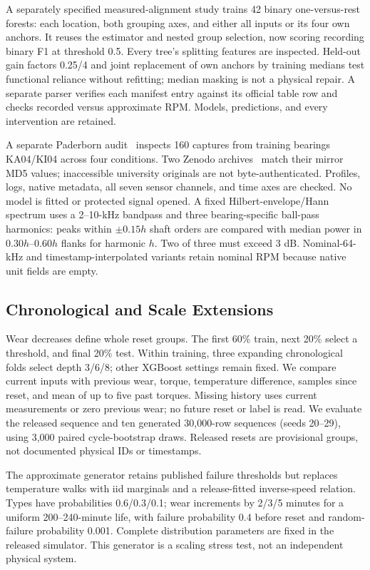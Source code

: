 \documentclass[conference]{IEEEtran}
\begin{document}
A separately specified measured-alignment study trains 42 binary one-versus-rest forests: each location, both grouping axes, and either all inputs or its four own anchors. It reuses the estimator and nested group selection, now scoring recording binary F1 at threshold 0.5. Every tree's splitting features are inspected. Held-out gain factors 0.25/4 and joint replacement of own anchors by training medians test functional reliance without refitting; median masking is not a physical repair. A separate parser verifies each manifest entry against its official table row and checks recorded versus approximate RPM. Models, predictions, and every intervention are retained.

A separate Paderborn audit~\cite{lessmeier2016benchmark} inspects 160 captures from training bearings KA04/KI04 across four conditions. Two Zenodo archives~\cite{vandenhoogen2025paderborn} match their mirror MD5 values; inaccessible university originals are not byte-authenticated. Profiles, logs, native metadata, all seven sensor channels, and time axes are checked. No model is fitted or protected signal opened. A fixed Hilbert-envelope/Hann spectrum uses a 2--10-kHz bandpass and three bearing-specific ball-pass harmonics: peaks within $\pm0.15h$ shaft orders are compared with median power in $0.30h$--$0.60h$ flanks for harmonic $h$. Two of three must exceed 3 dB. Nominal-64-kHz and timestamp-interpolated variants retain nominal RPM because native unit fields are empty.

\subsection{Chronological and Scale Extensions}
Wear decreases define whole reset groups. The first 60\% train, next 20\% select a threshold, and final 20\% test. Within training, three expanding chronological folds select depth 3/6/8; other XGBoost settings remain fixed. We compare current inputs with previous wear, torque, temperature difference, samples since reset, and mean of up to five past torques. Missing history uses current measurements or zero previous wear; no future reset or label is read. We evaluate the released sequence and ten generated 30{,}000-row sequences (seeds 20--29), using 3{,}000 paired cycle-bootstrap draws. Released resets are provisional groups, not documented physical IDs or timestamps.

The approximate generator retains published failure thresholds but replaces temperature walks with iid marginals and a release-fitted inverse-speed relation. Types have probabilities 0.6/0.3/0.1; wear increments by 2/3/5 minutes for a uniform 200--240-minute life, with failure probability 0.4 before reset and random-failure probability 0.001. Complete distribution parameters are fixed in the released simulator. This generator is a scaling stress test, not an independent physical system.
\end{document}
